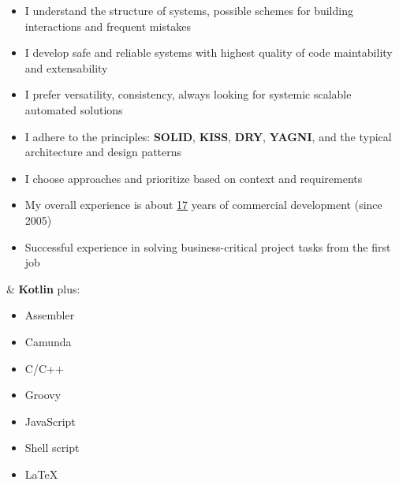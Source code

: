     \begin{minipage}[t]{0.76\textwidth} %
        \vspace{-\baselineskip} %
        

        \begin{itemize}[leftmargin=.0in]
        	\setlength\itemsep{0em}
            \item I understand the structure of systems, possible schemes for building interactions and frequent mistakes
            \item I develop safe and reliable systems with highest quality of code maintability and extensability
            \item I prefer versatility, consistency, always looking for systemic scalable automated solutions
            \item I adhere to the principles: \textbf{SOLID}, \textbf{KISS}, \textbf{DRY}, \textbf{YAGNI}, and the typical architecture and design patterns
            \item I choose approaches and prioritize based on context and requirements
            \item My overall experience is about \underline{17} years of commercial development (since 2005)
            \item Successful experience in solving business-critical project tasks from the first job
        \end{itemize}

    \end{minipage}
    \hfill %
    \begin{minipage}[t]{0.20\textwidth} %
        \vspace{-\baselineskip}
        
        
         \& \textbf{Kotlin} plus:
        \begin{itemize}[leftmargin=.2in]
        	\setlength\itemsep{0em}
        	\item Assembler
        	\item Camunda
        	\item C/C++
           	\item Groovy
           	\item JavaScript
           	\item Shell script
            
            
            \item \LaTeX
        \end{itemize}
    \end{minipage}

\vspace{0.4cm}